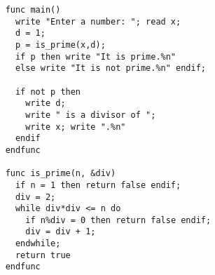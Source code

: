 \begin{verbatim}
    func main()
      write "Enter a number: "; read x;
      d = 1;
      p = is_prime(x,d);
      if p then write "It is prime.%n"
      else write "It is not prime.%n" endif;
      
      if not p then
        write d;
        write " is a divisor of ";
        write x; write ".%n"
      endif
    endfunc
    
    func is_prime(n, &div)
      if n = 1 then return false endif;
      div = 2;
      while div*div <= n do
        if n%div = 0 then return false endif;
        div = div + 1;
      endwhile;
      return true
    endfunc
\end{verbatim}
